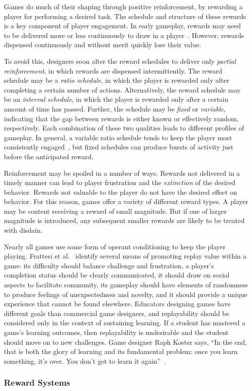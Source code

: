 \documentclass{sig-alternate-05-2015}
\begin{document}
Games do much of their shaping through positive reinforcement, by rewarding a player for performing a desired task. The schedule and structure of these rewards is a key component of player engagement. In early gameplay, rewards may need to be delivered more or less continuously to draw in a player~\cite{loftus1983mind}. However, rewards dispensed continuously and without merit quickly lose their value.



To avoid this, designers soon alter the reward schedules to deliver only {\em partial reinforcement}, in which rewards are dispensed intermittently. The reward schedule may be a {\em ratio schedule}, in which the player is rewarded only after completing a certain number of actions. Alternatively, the reward schedule may be an {\em interval schedule}, in which the player is rewarded only after a certain amount of time has passed. Further, the schedule may be {\em fixed} or {\em variable, }indicating that the gap between rewards is either known or effectively random, respectively. Each combination of these two qualities leads to different profiles of gameplay. In general, a variable ratio schedule tends to keep the player most consistently engaged~\cite{hopson01behavioral}, but fixed schedules can produce bursts of activity just before the anticipated reward.



Reinforcement may be spoiled in a number of ways. Rewards not delivered in a timely manner can lead to player frustration and the {\em extinction} of the desired behavior. Rewards not valuable to the player do not have the desired effect on behavior. For this reason, games offer a variety of different reward types. A player may be content receiving a reward of small magnitude. But if one of larger magnitude is introduced, any subsequent smaller rewards are likely to be treated with disdain.



Nearly all games use some form of operant conditioning to keep the player playing. Frattesi et al.~\cite{frattesi2011replayability} identify several means of promoting replay value within a game: its difficulty should balance challenge and frustration, a player's completion status should be clearly communicated, it should draw on social aspects to facilitate community, its gameplay should have elements of randomness to produce feelings of unexpectedness and novelty, and it should provide a unique experience that cannot be found elsewhere. Educators designing games have different goals than commercial game designers, and replayability should be considered only in the context of sustaining learning. If a student has mastered a game's learning outcomes, then replayability is undesirable and the student should move on to new challenges. Game designer Raph Koster says, ``In the end, that is both the glory of learning and its fundamental problem: once you learn something, it's over. You don't get to learn it again''~\cite{koster2013theory}.\subsubsection{Reward Systems}
\end{document}
